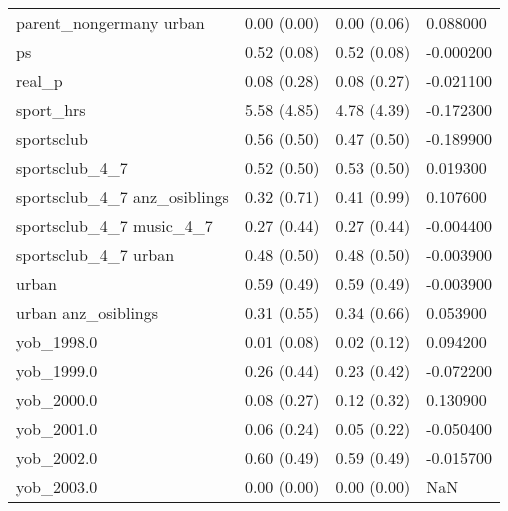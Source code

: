 \begin{tabular}{llll}
parent\_nongermany urban & 0.00 (0.00) & 0.00 (0.06) & 0.088000 \\
ps & 0.52 (0.08) & 0.52 (0.08) & -0.000200 \\
real\_p & 0.08 (0.28) & 0.08 (0.27) & -0.021100 \\
sport\_hrs & 5.58 (4.85) & 4.78 (4.39) & -0.172300 \\
sportsclub & 0.56 (0.50) & 0.47 (0.50) & -0.189900 \\
sportsclub\_4\_7 & 0.52 (0.50) & 0.53 (0.50) & 0.019300 \\
sportsclub\_4\_7 anz\_osiblings & 0.32 (0.71) & 0.41 (0.99) & 0.107600 \\
sportsclub\_4\_7 music\_4\_7 & 0.27 (0.44) & 0.27 (0.44) & -0.004400 \\
sportsclub\_4\_7 urban & 0.48 (0.50) & 0.48 (0.50) & -0.003900 \\
urban & 0.59 (0.49) & 0.59 (0.49) & -0.003900 \\
urban anz\_osiblings & 0.31 (0.55) & 0.34 (0.66) & 0.053900 \\
yob\_1998.0 & 0.01 (0.08) & 0.02 (0.12) & 0.094200 \\
yob\_1999.0 & 0.26 (0.44) & 0.23 (0.42) & -0.072200 \\
yob\_2000.0 & 0.08 (0.27) & 0.12 (0.32) & 0.130900 \\
yob\_2001.0 & 0.06 (0.24) & 0.05 (0.22) & -0.050400 \\
yob\_2002.0 & 0.60 (0.49) & 0.59 (0.49) & -0.015700 \\
yob\_2003.0 & 0.00 (0.00) & 0.00 (0.00) & NaN \\
\bottomrule
\end{tabular}
